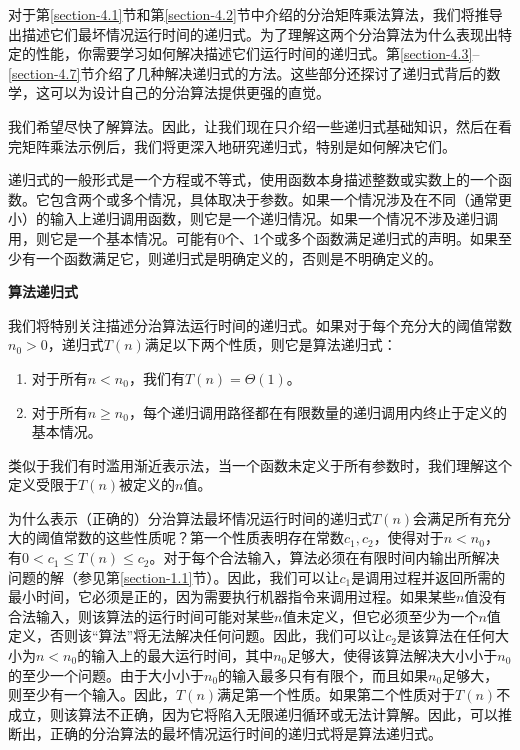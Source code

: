 \documentclass[lang=cn,newtx,10pt,scheme=chinese]{elegantbook}
\begin{document}
对于第\ref{section-4.1}节和第\ref{section-4.2}节中介绍的分治矩阵乘法算法，我们将推导出描述它们最坏情况运行时间的递归式。为了理解这两个分治算法为什么表现出特定的性能，你需要学习如何解决描述它们运行时间的递归式。第\ref{section-4.3}--\ref{section-4.7}节介绍了几种解决递归式的方法。这些部分还探讨了递归式背后的数学，这可以为设计自己的分治算法提供更强的直觉。

我们希望尽快了解算法。因此，让我们现在只介绍一些递归式基础知识，然后在看完矩阵乘法示例后，我们将更深入地研究递归式，特别是如何解决它们。

递归式的一般形式是一个方程或不等式，使用函数本身描述整数或实数上的一个函数。它包含两个或多个情况，具体取决于参数。如果一个情况涉及在不同（通常更小）的输入上递归调用函数，则它是一个递归情况。如果一个情况不涉及递归调用，则它是一个基本情况。可能有0个、1个或多个函数满足递归式的声明。如果至少有一个函数满足它，则递归式是明确定义的，否则是不明确定义的。

\textbf{算法递归式}

我们将特别关注描述分治算法运行时间的递归式。如果对于每个充分大的阈值常数$n_0>0$，递归式$T(n)$满足以下两个性质，则它是算法递归式：

\begin{enumerate}
\item 对于所有$n<n_0$，我们有$T(n)=\Theta(1)$。
\item 对于所有$n \geq n_0$，每个递归调用路径都在有限数量的递归调用内终止于定义的基本情况。
\end{enumerate}

类似于我们有时滥用渐近表示法，当一个函数未定义于所有参数时，我们理解这个定义受限于$T(n)$被定义的$n$值。

为什么表示（正确的）分治算法最坏情况运行时间的递归式$T(n)$会满足所有充分大的阈值常数的这些性质呢？第一个性质表明存在常数$c_1, c_2$，使得对于$n<n_0$，有$0<c_1 \leq T(n) \leq c_2$。对于每个合法输入，算法必须在有限时间内输出所解决问题的解（参见第\ref{section-1.1}节）。因此，我们可以让$c_1$是调用过程并返回所需的最小时间，它必须是正的，因为需要执行机器指令来调用过程。如果某些$n$值没有合法输入，则该算法的运行时间可能对某些$n$值未定义，但它必须至少为一个$n$值定义，否则该“算法”将无法解决任何问题。因此，我们可以让$c_2$是该算法在任何大小为$n<n_0$的输入上的最大运行时间，其中$n_0$足够大，使得该算法解决大小小于$n_0$的至少一个问题。由于大小小于$n_0$的输入最多只有有限个，而且如果$n_0$足够大，则至少有一个输入。因此，$T(n)$满足第一个性质。如果第二个性质对于$T(n)$不成立，则该算法不正确，因为它将陷入无限递归循环或无法计算解。因此，可以推断出，正确的分治算法的最坏情况运行时间的递归式将是算法递归式。
\end{document}
